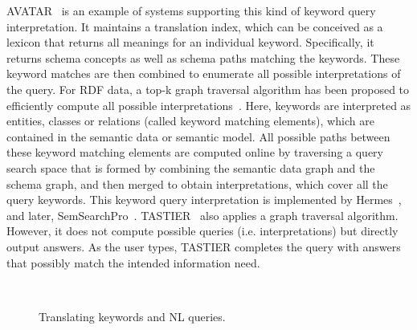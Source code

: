 AVATAR~\cite{DBLP:conf/sigmod/KandoganKRVZ06} is an example of systems supporting this kind of keyword query interpretation. It maintains a translation index, which can be conceived as a lexicon that returns all meanings for an individual keyword. Specifically, it returns schema concepts as well as schema paths matching the keywords. These keyword matches are then combined to enumerate all possible interpretations of the query. For RDF data, a top-k graph traversal algorithm has been proposed to efficiently compute all possible interpretations~\cite{DBLP:conf/icde/TranWRC09}. Here, keywords are interpreted as entities, classes or relations (called keyword matching elements), which are contained in the semantic data or semantic model. All possible paths between these keyword matching elements are computed online by traversing a query search space that is formed by combining the semantic data graph and the schema graph, and then merged to obtain interpretations, which cover all the query keywords. This keyword query interpretation is implemented by Hermes~\cite{DBLP:journals/ws/TranWH09}, and later, SemSearchPro~\cite{DBLP:journals/ws/TranHL11}. TASTIER~\cite{DBLP:conf/sigmod/LiJLF09} also applies a graph traversal algorithm. However, it does not compute possible queries (i.e. interpretations) but directly output answers. As the user types, TASTIER completes the query with answers that possibly match the intended information need. 

\begin{figure}[htb]
	\centering
  ~ %
 \caption{Translating keywords and NL queries.}
 \label{fig:translation}
\end{figure}


